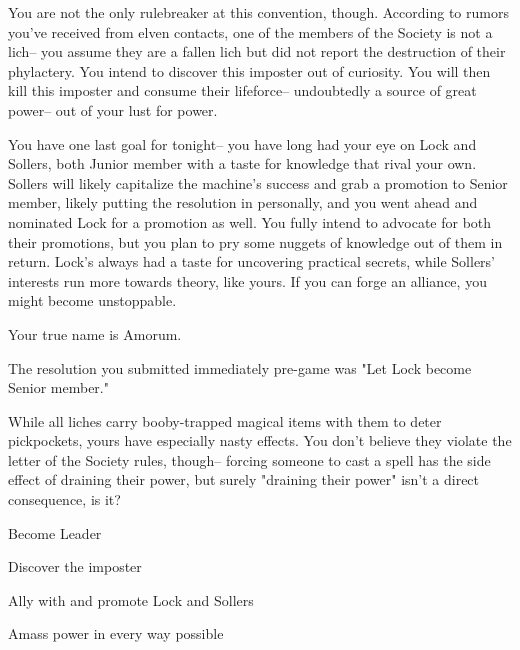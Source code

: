 \documentclass[char]{Sel}
\begin{document}
You are not the only rulebreaker at this convention, though. According to rumors you've received from elven contacts, one of the members of the Society is not a lich-- you assume they are a fallen lich but did not report the destruction of their phylactery. You intend to discover this imposter out of curiosity. You will then kill this imposter and consume their lifeforce-- undoubtedly a source of great power-- out of your lust for power.

You have one last goal for tonight-- you have long had your eye on Lock and Sollers, both Junior member with a taste for knowledge that rival your own. Sollers will likely capitalize the machine's success and grab a promotion to Senior member, likely putting the resolution in personally, and you went ahead and nominated Lock for a promotion as well. You fully intend to advocate for both their promotions, but you plan to pry some nuggets of knowledge out of them in return. Lock's always had a taste for uncovering practical secrets, while Sollers' interests run more towards theory, like yours. If you can forge an alliance, you might become unstoppable.

\begin{itemz}[Notes]
  \item Your true name is Amorum.
  \item The resolution you submitted immediately pre-game was "Let Lock become Senior member."
   \item While all liches carry booby-trapped magical items with them to deter pickpockets, yours have especially nasty effects. You don't believe they violate the letter of the Society rules, though-- forcing someone to cast a spell has the side effect of draining their power, but surely "draining their power" isn't a direct consequence, is it?

    \end{itemz}
    
 \begin{itemz}[Goals]
\item Become Leader
\item Discover the imposter
\item Ally with and promote Lock and Sollers
\item Amass power in every way possible
\end{itemz}
\end{document}
